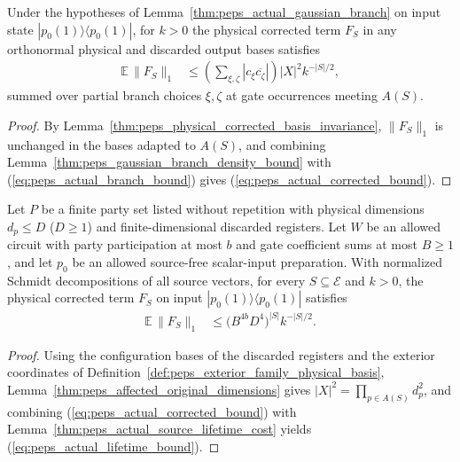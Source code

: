 \begin{lemma}
    \label{thm:peps_actual_corrected_source_bound}
    \leanok
    Under the hypotheses of Lemma~\ref{thm:peps_actual_gaussian_branch} on input
    state $|p_0(1)\rangle\langle p_0(1)|$, for $k>0$ the physical corrected term
    $F_S$ in any orthonormal physical and discarded output bases satisfies
    \begin{align}
        \mathbb E\,\|F_S\|_1
         & \leq
        \left(\sum_{\xi,\zeta}
        |c_{\xi}\overline{c_{\zeta}}|\right)
        |X|^2 k^{-|S|/2},
        \label{eq:peps_actual_corrected_bound}
    \end{align}
    summed over partial branch choices $\xi,\zeta$ at gate occurrences meeting
    $A(S)$.
\end{lemma}
\begin{proof}
    \leanok
    By Lemma~\ref{thm:peps_physical_corrected_basis_invariance}, $\|F_S\|_1$ is
    unchanged in the bases adapted to $A(S)$, and combining
    Lemma~\ref{thm:peps_gaussian_branch_density_bound} with
    (\ref{eq:peps_actual_branch_bound}) gives (\ref{eq:peps_actual_corrected_bound}).
\end{proof}

\begin{lemma}
    \label{thm:peps_actual_source_lifetime_bound}
    \leanok
    Let $P$ be a finite party set listed without repetition with physical
    dimensions $d_p\le D$ ($D\ge 1$) and finite-dimensional discarded registers.
    Let $W$ be an allowed circuit with party participation at most $b$ and gate
    coefficient sums at most $B\ge 1$, and let $p_0$ be an allowed source-free
    scalar-input preparation. With normalized Schmidt decompositions of all
    source vectors, for every $S\subseteq\mathcal E$ and $k>0$, the physical
    corrected term $F_S$ on input $|p_0(1)\rangle\langle p_0(1)|$ satisfies
    \begin{align}
        \mathbb E\,\|F_S\|_1
         & \leq
        \bigl(B^{4b}D^4\bigr)^{|S|} k^{-|S|/2}.
        \label{eq:peps_actual_lifetime_bound}
    \end{align}
\end{lemma}
\begin{proof}
    \leanok
    Using the configuration bases of the discarded registers and the
    exterior coordinates of Definition~\ref{def:peps_exterior_family_physical_basis},
    Lemma~\ref{thm:peps_affected_original_dimensions} gives
    $|X|^2=\prod_{p\in A(S)}d_p^2$, and combining
    (\ref{eq:peps_actual_corrected_bound}) with
    Lemma~\ref{thm:peps_actual_source_lifetime_cost} yields
    (\ref{eq:peps_actual_lifetime_bound}).
\end{proof}

